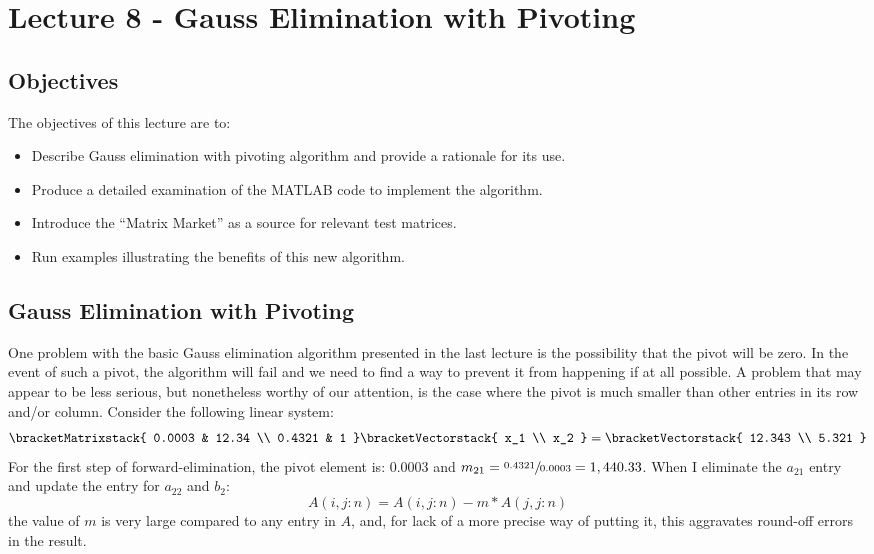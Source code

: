 \chapter{Lecture 8 - Gauss Elimination with Pivoting}
\label{ch:lec8n}
\section{Objectives}
The objectives of this lecture are to:
\begin{itemize}
\item Describe Gauss elimination with pivoting algorithm and provide a rationale for its use.
\item Produce a detailed examination of the MATLAB code to implement the algorithm.
\item Introduce the ``Matrix Market'' as a source for relevant test matrices.
\item Run examples illustrating the benefits of this new algorithm.
\end{itemize}
\setcounter{lstannotation}{0}

\section{Gauss Elimination with Pivoting}

One problem with the basic Gauss elimination algorithm presented in the last lecture is the possibility that the pivot will be zero.  In the event of such a pivot, the algorithm will fail and we need to find a way to prevent it from happening if at all possible.  A problem that may appear to be less serious, but nonetheless worthy of our attention, is the case where the pivot is much smaller than other entries in its row and/or column.  Consider the following linear system:
\begin{equation*}
\bracketMatrixstack{
0.0003 & 12.34 \\
0.4321 & 1 
}
\bracketVectorstack{
x_1 \\
x_2
}
=
\bracketVectorstack{
12.343 \\
5.321
}
\end{equation*}   
For the first step of forward-elimination, the pivot element is: 0.0003 and $m_{21} = \sfrac{0.4321}{0.0003} = 1,440.33$.  When I eliminate the $a_{21}$ entry and update the entry for $a_{22}$ and $b_2$:
\begin{equation*}
A(i,j:n) = A(i,j:n) - m*A(j,j:n)
\end{equation*}
the value of $m$ is very large compared to any entry in $A$, and, for lack of a more precise way of putting it, this aggravates round-off errors in the result. 

